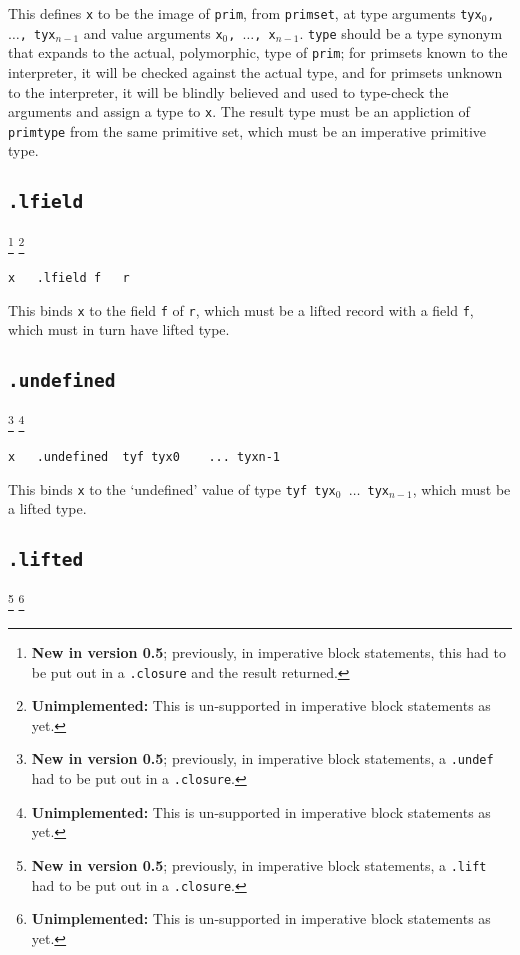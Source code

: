 \documentclass{report}
\newcommand\stringcode[1]{\texttt{#1}}
\newcommand\unimpl[1]{\footnote{\textbf{Unimplemented: }#1}}
\newcommand\new[2]{\footnote{\textbf{New in version #1}; previously, #2}}
\begin{document}
This defines \stringcode{x} to be the image of \stringcode{prim}, from \stringcode{primset},
at type arguments \stringcode{tyx$_0$, $\ldots$, tyx$_{n-1}$}
and value arguments \stringcode{x$_0$, $\ldots$, x$_{n-1}$}.
\stringcode{type} should be a type synonym that expands to the actual, polymorphic, type of \stringcode{prim};
for primsets known to the interpreter, it will be checked against the actual type,
and for primsets unknown to the interpreter,
it will be blindly believed and used to type-check the arguments and assign a type to \stringcode{x}.
The result type must be an appliction of \stringcode{primtype} from the same primitive set,
which must be an imperative primitive type.

\subsection{\stringcode{.lfield}}
\new{0.5}{in imperative block statements, this had to be put out in a \stringcode{.closure} and the result returned.}
\unimpl{This is un-supported in imperative block statements as yet.}

\begin{verbatim}
x	.lfield	f	r
\end{verbatim}

This binds \stringcode{x} to the field \stringcode{f} of \stringcode{r}, which must be a lifted record with a field \stringcode{f}, which must in turn have lifted type.

\subsection{\stringcode{.undefined}}
\new{0.5}{in imperative block statements, a \stringcode{.undef} had to be put out in a \stringcode{.closure}.}
\unimpl{This is un-supported in imperative block statements as yet.}

\begin{verbatim}
x	.undefined	tyf	tyx0	...	tyxn-1
\end{verbatim}

This binds \stringcode{x} to the `undefined' value of type \stringcode{tyf tyx$_0$ $\ldots$ tyx$_{n-1}$},
which must be a lifted type.

\subsection{\stringcode{.lifted}}
\new{0.5}{in imperative block statements, a \stringcode{.lift} had to be put out in a \stringcode{.closure}.}
\unimpl{This is un-supported in imperative block statements as yet.}
\end{document}
